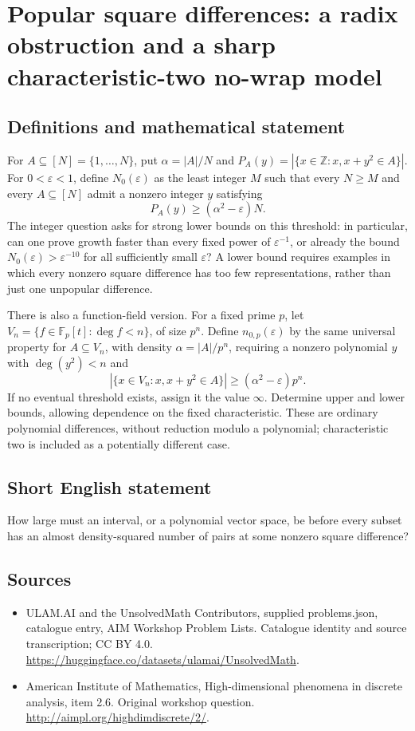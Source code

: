 \documentclass[11pt,a4paper]{article}
\begin{document}
\section*{Popular square differences: a radix obstruction and a sharp characteristic-two no-wrap model}\label{statement}

\subsection{Definitions and mathematical statement}
For $A\subseteq[N]=\{1,\ldots,N\}$, put $\alpha=|A|/N$ and
$P_A(y)=|\{x\in\mathbb Z:x,x+y^2\in A\}|$.
For $0<\varepsilon<1$, define $N_0(\varepsilon)$ as the least integer $M$ such that every $N\geq M$ and every $A\subseteq[N]$ admit a nonzero integer $y$ satisfying
\[
 P_A(y)\geq(\alpha^2-\varepsilon)N.
\]
The integer question asks for strong lower bounds on this threshold: in particular, can one prove growth faster than every fixed power of $\varepsilon^{-1}$, or already the bound $N_0(\varepsilon)>\varepsilon^{-10}$ for all sufficiently small $\varepsilon$?
A lower bound requires examples in which every nonzero square difference has too few representations, rather than just one unpopular difference.

There is also a function-field version.
For a fixed prime $p$, let $V_n=\{f\in\mathbb F_p[t]:\deg f<n\}$, of size $p^n$.
Define $n_{0,p}(\varepsilon)$ by the same universal property for $A\subseteq V_n$, with density $\alpha=|A|/p^n$, requiring a nonzero polynomial $y$ with $\deg(y^2)<n$ and
\[
 |\{x\in V_n:x,x+y^2\in A\}|\geq(\alpha^2-\varepsilon)p^n.
\]
If no eventual threshold exists, assign it the value $\infty$.
Determine upper and lower bounds, allowing dependence on the fixed characteristic.
These are ordinary polynomial differences, without reduction modulo a polynomial; characteristic two is included as a potentially different case.
\subsection{Short English statement}
How large must an interval, or a polynomial vector space, be before every subset has an almost density-squared number of pairs at some nonzero square difference?
\subsection{Sources}
\begin{itemize}
\item[S1] ULAM.AI and the UnsolvedMath Contributors, supplied problems.json, catalogue entry, AIM Workshop Problem Lists. Catalogue identity and source transcription; CC BY 4.0.
\url{https://huggingface.co/datasets/ulamai/UnsolvedMath}.
\item[S2] American Institute of Mathematics, High-dimensional phenomena in discrete analysis, item 2.6. Original workshop question.
\url{http://aimpl.org/highdimdiscrete/2/}.
\end{itemize}
\end{document}
